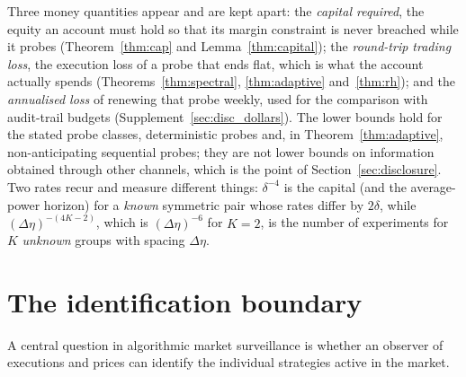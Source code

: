 \documentclass[12pt]{article}
\theoremstyle{definition}
\theoremstyle{remark}
\begin{document}
Three money quantities appear and are kept apart: the \emph{capital required}, the equity an account must hold so that its margin constraint is never breached while it probes (Theorem~\ref{thm:cap} and Lemma~\ref{thm:capital}); the \emph{round-trip trading loss}, the execution loss of a probe that ends flat, which is what the account actually spends (Theorems~\ref{thm:spectral}, \ref{thm:adaptive} and~\ref{thm:rh}); and the \emph{annualised loss} of renewing that probe weekly, used for the comparison with audit-trail budgets (Supplement~\ref{sec:disc_dollars}). The lower bounds hold for the stated probe classes, deterministic probes and, in Theorem~\ref{thm:adaptive}, non-anticipating sequential probes; they are not lower bounds on information obtained through other channels, which is the point of Section~\ref{sec:disclosure}. Two rates recur and measure different things: $\delta^{-4}$ is the capital (and the average-power horizon) for a \emph{known} symmetric pair whose rates differ by $2\delta$, while $(\Delta\eta)^{-(4K-2)}$, which is $(\Delta\eta)^{-6}$ for $K=2$, is the number of experiments for $K$ \emph{unknown} groups with spacing $\Delta\eta$.

\section{The identification boundary}\label{sec:ident}

A central question in algorithmic market surveillance is whether an observer of executions and prices can identify the individual strategies active in the market.
\end{document}
